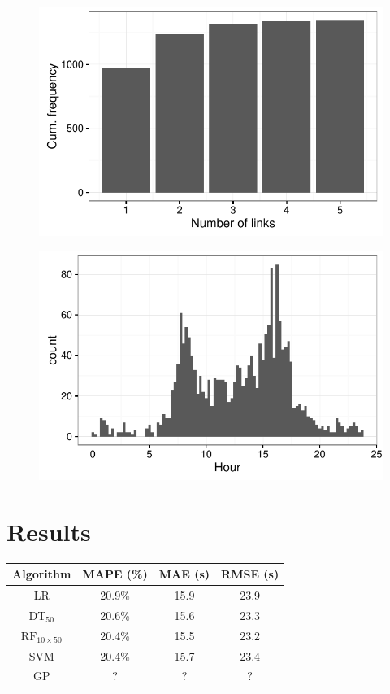 \documentclass[11pt]{article}
\begin{document}
\begin{figure}[h!]
    \center
    \includegraphics[scale=.8]{../plots/d1_loi_b5p_by_journeyref}
    \caption{}    
\end{figure}


\begin{figure}[h!]
    \center
    \includegraphics[scale=.8]{../plots/d1_loi_b5p_hour_histogram}
    \caption{}    
\end{figure}

\clearpage

\section{Results}\label{ch:results}
\begin{table}[h!]
    \center
    \footnotesize
    \begin{tabular}{c|ccc}
        Algorithm & MAPE (\%) & MAE (s) & RMSE (s) \\ \hline \hline
        $\text{LR}$ & 20.9\% & 15.9 & 23.9 \\ \hline
        $\text{DT}_{50}$ & 20.6\% & 15.6 & 23.3 \\ \hline
        $\text{RF}_{10 \times 50}$ & 20.4\% & 15.5 & 23.2 \\ \hline
        $\text{SVM}$ & 20.4\% & 15.7 & 23.4 \\ \hline
        $\text{GP}$ & ? & ? & ? \\ \hline
    \end{tabular}
\end{table}

\begin{spacing}{1}
  
  
\end{spacing}
\end{document}
